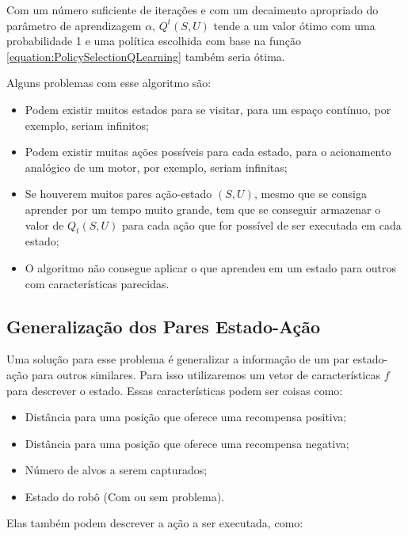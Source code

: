 Com um número suficiente de iterações e com um decaimento apropriado do parâmetro de aprendizagem $ \alpha $, $ Q^t \left( S, U \right) $ tende a um valor ótimo  com uma probabilidade 1 \cite{journals:ml:Tsitsiklis94,Jaakkola94convergenceof,Watkins:1989} e uma política escolhida com base na função \ref{equation:PolicySelectionQLearning} também seria ótima.

Alguns problemas com esse algoritmo são:

\begin{itemize}
	\item Podem existir muitos estados para se visitar, para um espaço contínuo, por exemplo, seriam infinitos;
	\item Podem existir muitas ações possíveis para cada estado, para o acionamento analógico de um motor, por exemplo, seriam infinitas;
	\item Se houverem muitos pares ação-estado $ \left( S, U \right) $, mesmo que se consiga aprender por um tempo muito grande, tem que se conseguir armazenar o valor de $ Q_t \left( S, U \right) $ para cada ação que for possível de ser executada em cada estado;
	\item O algoritmo não consegue aplicar o que aprendeu em um estado para outros com características parecidas.
\end{itemize}

\subsection{Generalização dos Pares Estado-Ação} \label{subsection:GeneralizaçãoParesEstadoAção}

Uma solução para esse problema é generalizar a informação de um par estado-ação para outros similares. Para isso utilizaremos um vetor de características $ f $ para descrever o estado. Essas características podem ser coisas como:

\begin{itemize}
	\item Distância para uma posição que oferece uma recompensa positiva;
	\item Distância para uma posição que oferece uma recompensa negativa;
	\item Número de alvos a serem capturados;
	\item Estado do robô (Com ou sem problema).
\end{itemize}

Elas também podem descrever a ação a ser executada, como:

